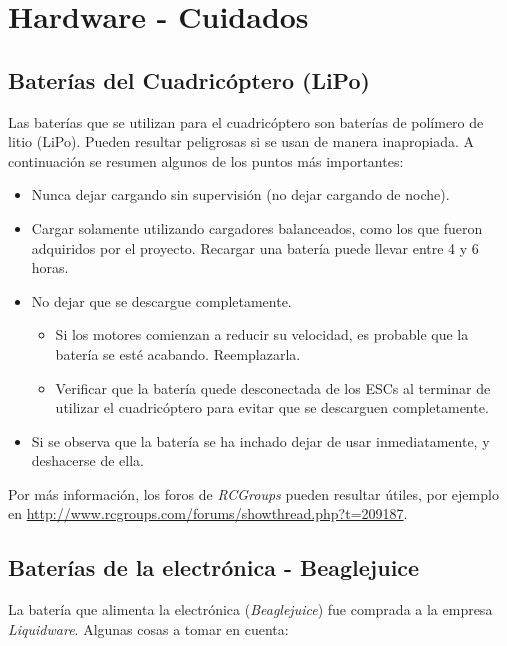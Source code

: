 \documentclass[main]{subfiles}
\begin{document}
\chapter{Hardware - Cuidados}
\label{chap:hardware-cuidados}

\section{Baterías del Cuadricóptero (LiPo)}
\label{sec:hardware-cuidados--baterias-del-cuadricoptero-lipo}

Las baterías que se utilizan para el cuadricóptero son baterías de polímero de litio (LiPo). Pueden resultar peligrosas si se usan de manera inapropiada. A continuación se resumen algunos de los puntos más importantes:
\begin{itemize}
\item Nunca dejar cargando sin supervisión (no dejar cargando de noche).
\item Cargar solamente utilizando cargadores balanceados, como los que fueron adquiridos por el proyecto. Recargar una batería puede llevar entre 4 y 6 horas.
\item No dejar que se descargue completamente.
  \begin{itemize}
  \item Si los motores comienzan a reducir su velocidad, es probable que la batería se esté acabando. Reemplazarla.
  \item Verificar que la batería quede desconectada de los ESCs al terminar de utilizar el cuadricóptero para evitar que se descarguen completamente.
  \end{itemize}
\item Si se observa que la batería se ha inchado dejar de usar inmediatamente, y deshacerse de ella.
\end{itemize}

Por más información, los foros de \textit{RCGroups} pueden resultar útiles, por ejemplo en \url{http://www.rcgroups.com/forums/showthread.php?t=209187}.

\section{Baterías de la electrónica - Beaglejuice}
\label{sec:hardware-cuidados-baterias-de-la-electronica-beaglejuice}

La batería que alimenta la electrónica (\textit{Beaglejuice}) fue comprada a la empresa \textit{Liquidware}. Algunas cosas a tomar en cuenta:
\end{document}
